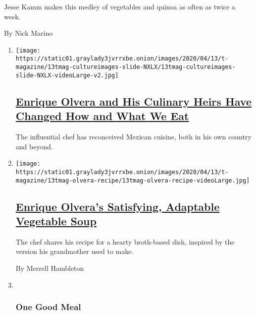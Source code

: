 \begin{enumerate}
\begin{enumerate}
    Jesse Kamm makes this medley of vegetables and quinoa as often as
    twice a week.

    By Nick Marino
  \end{enumerate}
\end{enumerate}

\begin{enumerate}
\def\labelenumi{\arabic{enumi}.}
\item
  \texttt{[image: https://static01.graylady3jvrrxbe.onion/images/2020/04/13/t-magazine/13tmag-cultureimages-slide-NXLX/13tmag-cultureimages-slide-NXLX-videoLarge-v2.jpg]}

  \hypertarget{enrique-olvera-and-his-culinary-heirs-have-changed-how-and-what-we-eat}{%
  \subsection{\texorpdfstring{\href{/interactive/2020/04/13/t-magazine/enrique-olvera-chef.html}{Enrique
  Olvera and His Culinary Heirs Have Changed How and What We
  Eat}}{Enrique Olvera and His Culinary Heirs Have Changed How and What We Eat}}\label{enrique-olvera-and-his-culinary-heirs-have-changed-how-and-what-we-eat}}

  The influential chef has reconceived Mexican cuisine, both in his own
  country and beyond.
\item
  \texttt{[image: https://static01.graylady3jvrrxbe.onion/images/2020/04/13/t-magazine/13tmag-olvera-recipe/13tmag-olvera-recipe-videoLarge.jpg]}

  \hypertarget{enrique-olveras-satisfying-adaptable-vegetable-soup}{%
  \subsection{\texorpdfstring{\href{/2020/04/13/t-magazine/enrique-olvera-vegetable-soup-recipe.html}{Enrique
  Olvera's Satisfying, Adaptable Vegetable
  Soup}}{Enrique Olvera's Satisfying, Adaptable Vegetable Soup}}\label{enrique-olveras-satisfying-adaptable-vegetable-soup}}

  The chef shares his recipe for a hearty broth-based dish, inspired by
  the version his grandmother used to make.

  By Merrell Hambleton
\item ~
  \hypertarget{one-good-meal-2}{%
  \subsubsection{One Good Meal}\label{one-good-meal-2}}


\end{enumerate}
